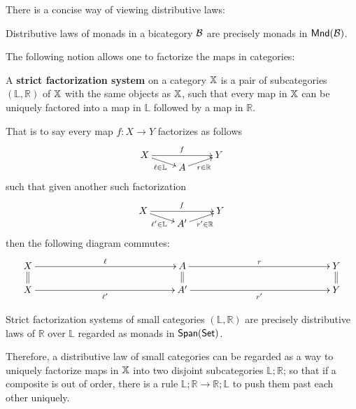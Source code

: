 There is a concise way of viewing distributive laws:
\begin{lemma}
Distributive laws of monads in a bicategory $\cal B$ are precisely monads in ${\sf Mnd}({\cal B})$.
\end{lemma}
The following notion allows one to factorize the maps in categories:
\begin{definition}
A {\bf strict factorization system} on a category $\mathbb{X}$ is a pair of subcategories $(\mathbb{L},\mathbb{R})$ of $\mathbb{X}$ with the same objects as $\mathbb{X}$, such that every map in $\mathbb{X}$ can be uniquely factored into a map in $\mathbb{L}$ followed by a map in  $\mathbb{R}$.


That is to say every map $f:X\to Y$ factorizes as follows
$$\xymatrixrowsep{0mm}
\xymatrix{
X  \ar[rr]^{f} \ar[dr]_{\ell \in {\mathbb L}} &       & Y\\
   & A \ar[ur]_{r \in {\mathbb R}}
}
$$
such that given another such factorization
$$\xymatrixrowsep{0mm}
\xymatrix{
X  \ar[rr]^{f} \ar[dr]_{\ell' \in {\mathbb L}} &       & Y\\
   & A' \ar[ur]_{r' \in {\mathbb R}}
}
$$
then the following diagram commutes:
$$
\xymatrixrowsep{4mm}
\xymatrixcolsep{50mm}
\xymatrix{
X \ar@{=}[d] \ar[r]^{\ell}   & A  \ar@{=}[d] \ar[r]^{r} & Y \ar@{=}[d]\\
X   \ar[r]_{\ell'}                & A' \ar[r]_{r'} & Y
}
$$
\end{definition}
\begin{lemma}
\label{lemma:rosebrugh}
Strict factorization systems of small categories $(\mathbb L,\mathbb R)$ are precisely distributive laws of $\mathbb R$ over $\mathbb L$ regarded as monads in $\mathsf{Span}(\mathsf{Set})$.
\end{lemma}
Therefore, a distributive law of small categories can be regarded as a way to uniquely factorize maps in $\mathbb{X}$ into two disjoint subcategories $\mathbb{L};\mathbb{R}$; so that if a composite is out of order, there is a rule $\mathbb{L};\mathbb{R}\to \mathbb{R};\mathbb{L}$ to push them past each other uniquely.


